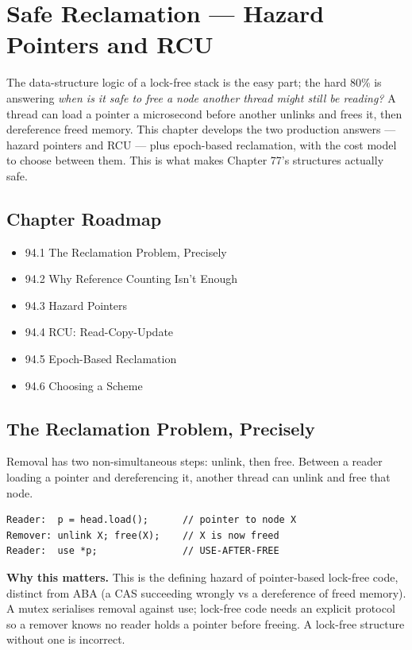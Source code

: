 \chapter{Safe Reclamation --- Hazard Pointers and RCU}

The data-structure logic of a lock-free stack is the easy part; the hard 80\% is answering \emph{when is it safe to free a node another thread might still be reading?} A thread can load a pointer a microsecond before another unlinks and frees it, then dereference freed memory. This chapter develops the two production answers --- hazard pointers and RCU --- plus epoch-based reclamation, with the cost model to choose between them. This is what makes Chapter 77's structures actually safe.

\section*{Chapter Roadmap}
\begin{itemize}
\item 94.1 The Reclamation Problem, Precisely
\item 94.2 Why Reference Counting Isn't Enough
\item 94.3 Hazard Pointers
\item 94.4 RCU: Read-Copy-Update
\item 94.5 Epoch-Based Reclamation
\item 94.6 Choosing a Scheme
\end{itemize}

\section{The Reclamation Problem, Precisely}
Removal has two non-simultaneous steps: unlink, then free. Between a reader loading a pointer and dereferencing it, another thread can unlink and free that node.

\begin{lstlisting}[language=text, caption={The reclamation use-after-free window.}]
Reader:  p = head.load();      // pointer to node X
Remover: unlink X; free(X);    // X is now freed
Reader:  use *p;               // USE-AFTER-FREE
\end{lstlisting}

\textbf{Why this matters.} This is the defining hazard of pointer-based lock-free code, distinct from ABA (a CAS succeeding wrongly vs a dereference of freed memory). A mutex serialises removal against use; lock-free code needs an explicit protocol so a remover knows no reader holds a pointer before freeing. A lock-free structure without one is incorrect.

